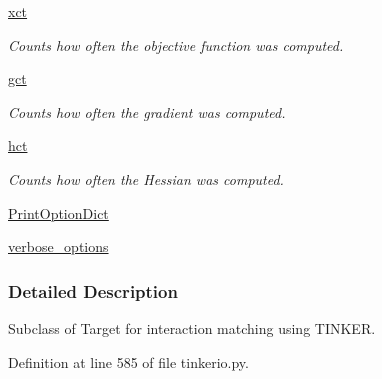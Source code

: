 \begin{DoxyCompactItemize}
\hyperlink{classforcebalance_1_1target_1_1Target_ad4cd0ab38d8fc97d3e7a6e22ce130a16}{xct}
\begin{DoxyCompactList}\small\item\em \-Counts how often the objective function was computed. \end{DoxyCompactList}\item 
\hyperlink{classforcebalance_1_1target_1_1Target_aff6e42b84dd8eb5a4dc3b47aa58bc64c}{gct}
\begin{DoxyCompactList}\small\item\em \-Counts how often the gradient was computed. \end{DoxyCompactList}\item 
\hyperlink{classforcebalance_1_1target_1_1Target_ae929918b7e695a99d7ec946d06d793e1}{hct}
\begin{DoxyCompactList}\small\item\em \-Counts how often the \-Hessian was computed. \end{DoxyCompactList}\item 
\hyperlink{classforcebalance_1_1BaseClass_afc6659278497d7245bc492ecf405ccae}{\-Print\-Option\-Dict}
\item 
\hyperlink{classforcebalance_1_1BaseClass_afd68efa29ccd2f320f4cf82198214aac}{verbose\-\_\-options}
\end{DoxyCompactItemize}


\subsubsection{\-Detailed \-Description}
\-Subclass of \-Target for interaction matching using \-T\-I\-N\-K\-E\-R. 



\-Definition at line 585 of file tinkerio.\-py.




